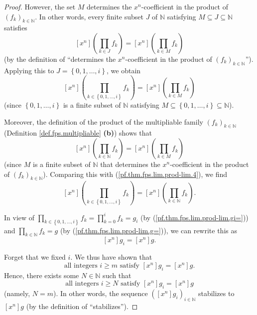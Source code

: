\begin{fineprint}
\begin{proof}
However, the set $M$ determines the $x^{n}$-coefficient in the product of
$\left(  f_{k}\right)  _{k\in\mathbb{N}}$. In other words, every finite subset
$J$ of $\mathbb{N}$ satisfying $M\subseteq J\subseteq\mathbb{N}$ satisfies%
\[
\left[  x^{n}\right]  \left(  \prod_{k\in J}f_{k}\right)  =\left[
x^{n}\right]  \left(  \prod_{k\in M}f_{k}\right)
\]
(by the definition of \textquotedblleft determines the $x^{n}$-coefficient in
the product of $\left(  f_{k}\right)  _{k\in\mathbb{N}}$\textquotedblright).
Applying this to $J=\left\{  0,1,\ldots,i\right\}  $, we obtain%
\begin{equation}
\left[  x^{n}\right]  \left(  \prod_{k\in\left\{  0,1,\ldots,i\right\}  }%
f_{k}\right)  =\left[  x^{n}\right]  \left(  \prod_{k\in M}f_{k}\right)
\label{pf.thm.fps.lim.prod-lim.4}%
\end{equation}
(since $\left\{  0,1,\ldots,i\right\}  $ is a finite subset of $\mathbb{N}$
satisfying $M\subseteq\left\{  0,1,\ldots,i\right\}  \subseteq\mathbb{N}$).

Moreover, the definition of the product of the multipliable family $\left(
f_{k}\right)  _{k\in\mathbb{N}}$ (Definition \ref{def.fps.multipliable}
\textbf{(b)}) shows that%
\[
\left[  x^{n}\right]  \left(  \prod_{k\in\mathbb{N}}f_{k}\right)  =\left[
x^{n}\right]  \left(  \prod_{k\in M}f_{k}\right)
\]
(since $M$ is a finite subset of $\mathbb{N}$ that determines the $x^{n}%
$-coefficient in the product of $\left(  f_{k}\right)  _{k\in\mathbb{N}}$).
Comparing this with (\ref{pf.thm.fps.lim.prod-lim.4}), we find%
\[
\left[  x^{n}\right]  \left(  \prod_{k\in\left\{  0,1,\ldots,i\right\}  }%
f_{k}\right)  =\left[  x^{n}\right]  \left(  \prod_{k\in\mathbb{N}}%
f_{k}\right)  .
\]


In view of $\prod_{k\in\left\{  0,1,\ldots,i\right\}  }f_{k}=\prod_{k=0}%
^{i}f_{k}=g_{i}$ (by (\ref{pf.thm.fps.lim.prod-lim.gi=})) and $\prod
_{k\in\mathbb{N}}f_{k}=g$ (by (\ref{pf.thm.fps.lim.prod-lim.g=})), we can
rewrite this as%
\[
\left[  x^{n}\right]  g_{i}=\left[  x^{n}\right]  g.
\]


Forget that we fixed $i$. We thus have shown that
\[
\text{all integers }i\geq m\text{ satisfy }\left[  x^{n}\right]  g_{i}=\left[
x^{n}\right]  g.
\]
Hence, there exists some $N\in\mathbb{N}$ such that
\[
\text{all integers }i\geq N\text{ satisfy }\left[  x^{n}\right]  g_{i}=\left[
x^{n}\right]  g
\]
(namely, $N=m$). In other words, the sequence $\left(  \left[  x^{n}\right]
g_{i}\right)  _{i\in\mathbb{N}}$ stabilizes to $\left[  x^{n}\right]  g$ (by
the definition of \textquotedblleft stabilizes\textquotedblright).


\end{proof}
\end{fineprint}
